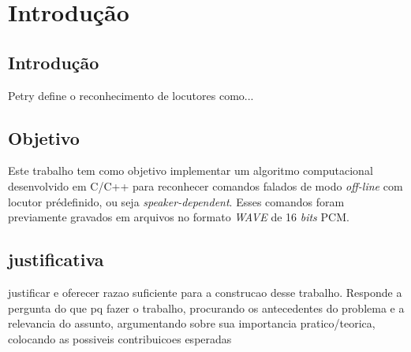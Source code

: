 \documentclass[a4paper,12pt,twoside,openright]{report}
\begin{document}
\chapter{Introdu\c{c}\~{a}o}
\thispagestyle{myheadings}
\pagestyle{myheadings}
\section{Introdu\c{c}\~{a}o}
\label{cap1}
\par Petry \cite{PETRY2002} define o reconhecimento de locutores como...
\section{Objetivo}
\par Este trabalho tem como objetivo implementar um algoritmo computacional desenvolvido em C/C++ para reconhecer comandos falados de modo \textit{off-line} com locutor pr\'{e}definido, ou seja \textit{speaker-dependent}. Esses comandos foram previamente gravados em arquivos no formato \textit{WAVE} de 16 \textit{bits} PCM.

\section{justificativa}
\par justificar e oferecer razao suficiente para a construcao desse trabalho. Responde a pergunta do que pq fazer o trabalho, procurando os antecedentes do problema e a relevancia do assunto, argumentando sobre sua importancia pratico/teorica, colocando as possiveis contribuicoes esperadas

\end{document}
